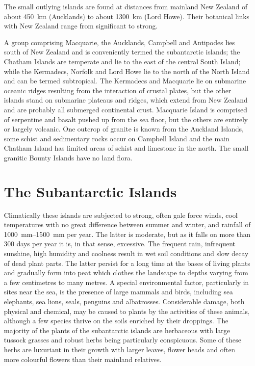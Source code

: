 The small outlying islands are found at distances from mainland New Zealand of about \SI{450}{\kilo\metre} (Aucklands) to about \SI{1300}{\kilo\metre} (Lord Howe).
Their botanical links with New Zealand range from significant to strong.

A group comprising Macquarie, the Aucklands, Campbell and Antipodes lies south of New Zealand and is conveniently termed the subantarctic islands; the Chatham Islands are temperate and lie to the east of the central South Island; while the Kermadecs, Norfolk and Lord Howe lie to the north of the North Island and can be termed subtropical.
The Kermadecs and Macquarie lie on submarine oceanic ridges resulting from the interaction of crustal plates, but the other islands stand on submarine plateaus and ridges, which extend from New Zealand and are probably all submerged continental crust.
Macquarie Island is comprised of serpentine and basalt pushed up from the sea floor, but the others are entirely or largely volcanic.
One outcrop of granite is known from the Auckland Islands, some schist and sedimentary rocks occur on Campbell Island and the main Chatham Island has limited areas of schist and limestone in the north.
The small granitic Bounty Islands have no land flora.

\section{The Subantarctic Islands}

Climatically these islands are subjected to strong, often gale force winds, cool temperatures with no great difference between summer and winter, and rainfall of \SIrange{1000}{1500}{\milli\metre} per year.
The latter is moderate, but as it falls on more than 300 days per year it is, in that sense, excessive.
The frequent rain, infrequent sunshine, high humidity and coolness result in wet soil conditions and slow decay of dead plant parts.
The latter persist for a long time at the bases of living plants and gradually form into peat which clothes the landscape to depths varying from a few centimetres to many metres.
A special environmental factor, particularly in sites near the sea, is the presence of large mammals and  birds, including sea elephants, sea lions, seals, penguins and albatrosses.
Considerable damage, both physical and chemical, may be caused to plants by the activities of these animals, although a few species thrive on the soils enriched by their droppings.
The majority of the plants of the subantarctic islands are herbaceous with large tussock grasses and robust herbs being particularly conspicuous.
Some of these herbs are luxuriant in their growth with larger leaves, flower heads and often more colourful flowers than their mainland relatives.

